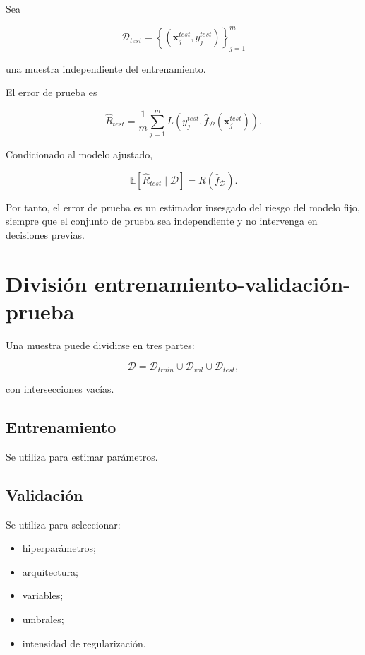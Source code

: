 \documentclass[
  spanish,
  10.5pt,
  letterpaper,
  DIV=11,
  numbers=noendperiod,
  oneside,
  open=any]{scrreprt}
\providecommand{\tightlist}{%
  \setlength{\itemsep}{0pt}\setlength{\parskip}{0pt}}
\theoremstyle{definition}
\theoremstyle{definition}
\theoremstyle{plain}
\theoremstyle{remark}
\begin{document}

Sea

\[
\mathcal{D}_{test}
=
\left\{
(\mathbf{x}^{test}_j,y^{test}_j)
\right\}_{j=1}^{m}
\]

una muestra independiente del entrenamiento.

El error de prueba es

\[
\widehat{R}_{test}
=
\frac{1}{m}
\sum_{j=1}^{m}
L
\left(
y^{test}_j,
\widehat{f}_{\mathcal{D}}(\mathbf{x}^{test}_j)
\right).
\]

Condicionado al modelo ajustado,

\[
\mathbb{E}
\left[
\widehat{R}_{test}
\mid
\mathcal{D}
\right]
=
R(\widehat{f}_{\mathcal{D}}).
\]

Por tanto, el error de prueba es un estimador insesgado del riesgo del
modelo fijo, siempre que el conjunto de prueba sea independiente y no
intervenga en decisiones previas.

\section*{División
entrenamiento-validación-prueba}\label{divisiuxf3n-entrenamiento-validaciuxf3n-prueba}


Una muestra puede dividirse en tres partes:

\[
\mathcal{D}
=
\mathcal{D}_{train}
\cup
\mathcal{D}_{val}
\cup
\mathcal{D}_{test},
\]

con intersecciones vacías.

\subsection*{Entrenamiento}\label{entrenamiento}

Se utiliza para estimar parámetros.

\subsection*{Validación}\label{validaciuxf3n}

Se utiliza para seleccionar:

\begin{itemize}
\tightlist
\item
  hiperparámetros;
\item
  arquitectura;
\item
  variables;
\item
  umbrales;
\item
  intensidad de regularización.
\end{itemize}
\end{document}
